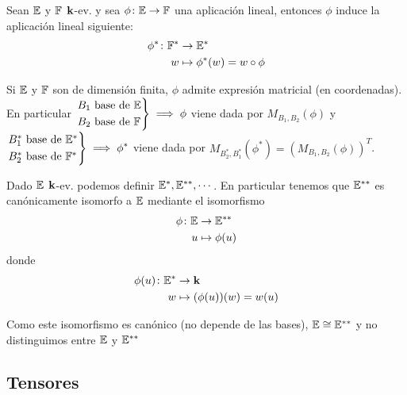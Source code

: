 \begin{prop}
	Sean $\mathbb{E}$ y $\mathbb{F}$ $\mathbf{k}$-ev. y sea $\phi \colon \mathbb{E} \to \mathbb{F}$ una
	aplicación lineal, entonces $\phi$ induce la aplicación
	lineal siguiente:
	\[
		\begin{aligned}
		\phi^* \colon \mathbb{F}^* &\to \mathbb{E}^*\\
		w &\mapsto \phi^*(w) = w \circ \phi
		\end{aligned}
	\]
\end{prop}
\begin{obs}
	Si $\mathbb{E}$ y $\mathbb{F}$ son de dimensión finita, $\phi$ admite expresión
	matricial (en coordenadas). En particular
	$\displaystyle \begin{rcases} B_1 \text{ base de } \mathbb{E} \\ B_2
	\text{ base de } \mathbb{F} \end{rcases} \implies \phi$ viene dada por
	$M_{B_1,B_2}(\phi)$ y $\displaystyle \begin{rcases} B_1^*
	\text{ base de } \mathbb{E}^* \\ B_2^* \text{ base de } \mathbb{F}^*
	\end{rcases} \implies \phi^*$ viene dada por 
	$M_{B_2^*,B_1^*}(\phi^*) = (M_{B_1,B_2}(\phi))^T$.
\end{obs}
\begin{prop}
	Dado $\mathbb{E}$ $\mathbf{k}$-ev. podemos definir $\mathbb{E}^*,\mathbb{E}^{**},\cdots$. En
	particular tenemos que $\mathbb{E}^{**}$ es canónicamente isomorfo a
	$\mathbb{E}$ mediante el isomorfismo
	\[
		\begin{aligned}
			\phi \colon \mathbb{E} &\to \mathbb{E}^{**}\\
			u &\mapsto \phi(u)
		\end{aligned}
	\]
	donde
	\[
		\begin{aligned}
			\phi(u) \colon \mathbb{E}^* &\to \mathbf{k} \\
			w &\mapsto (\phi(u))(w) = w(u)
		\end{aligned}
	\]
\end{prop}
\begin{obs}
	Como este isomorfismo es canónico (no depende de las bases),
	$\mathbb{E} \cong \mathbb{E}^{**}$ y no distinguimos entre $\mathbb{E}$ y $\mathbb{E}^{**}$
\end{obs}



\subsection{Tensores}

